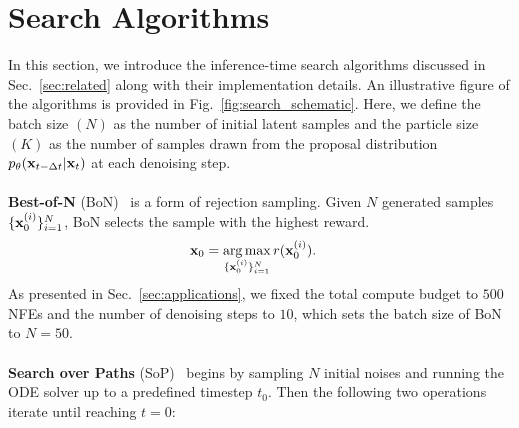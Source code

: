 



\section{Search Algorithms}
\label{sec:appendix_inference_time_scaling}
In this section, we introduce the inference-time search algorithms discussed in Sec.~\ref{sec:related} along with their implementation details. An illustrative figure of the algorithms is provided in Fig.~\ref{fig:search_schematic}. 
Here, we define the batch size $(N)$ as the number of initial latent samples and the particle size $(K)$ as the number of samples drawn from the proposal distribution $p_\theta(\mathbf{x}_{t-\Delta t} | \mathbf{x}_t)$ at each denoising step. 
\\
\\
\textbf{Best-of-N} (BoN)~\cite{Stiennon:2020BoN,Tang:2024Realfill} is a form of rejection sampling. Given $N$ generated samples $\{ \mathbf{x}^{(i)}_{0} \}_{i=1}^N$, BoN selects the sample with the highest reward. 
\begin{align}
    \nonumber
    \mathbf{x}_{0} &= \operatorname*{arg\,max}_{\{ \mathbf{x}^{(i)}_{0} \}_{i=1}^N } r(\mathbf{x}_{0}^{(i)}).
\end{align}
As presented in Sec.~\ref{sec:applications}, we fixed the total compute budget to $500$ NFEs and the number of denoising steps to $10$, which sets the batch size of BoN to $N=50$.
\\
\\
\textbf{Search over Paths} (SoP)~\cite{Ma2025:SoP} begins by sampling $N$ initial noises and running the ODE solver up to a predefined timestep $t_0$. Then the following two operations iterate until reaching $t=0$:

